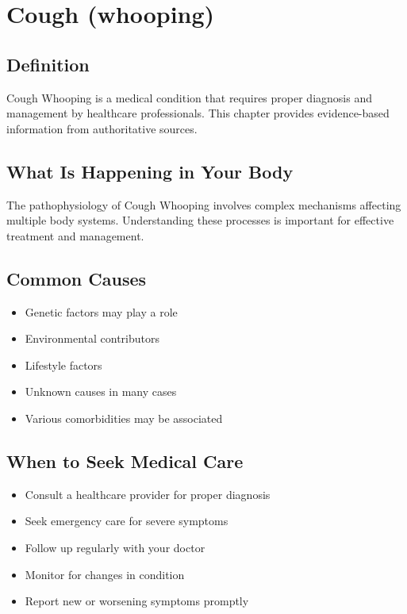 
\chapter{Cough (whooping)}

\section*{Definition}
Cough Whooping is a medical condition that requires proper diagnosis and management by healthcare professionals. This chapter provides evidence-based information from authoritative sources.

\section*{What Is Happening in Your Body}
The pathophysiology of Cough Whooping involves complex mechanisms affecting multiple body systems. Understanding these processes is important for effective treatment and management.

\section*{Common Causes}
\begin{itemize}
  \item Genetic factors may play a role
  \item Environmental contributors
  \item Lifestyle factors
  \item Unknown causes in many cases
  \item Various comorbidities may be associated
\end{itemize}

\section*{When to Seek Medical Care}
\begin{itemize}
  \item Consult a healthcare provider for proper diagnosis
  \item Seek emergency care for severe symptoms
  \item Follow up regularly with your doctor
  \item Monitor for changes in condition
  \item Report new or worsening symptoms promptly
\end{itemize}

